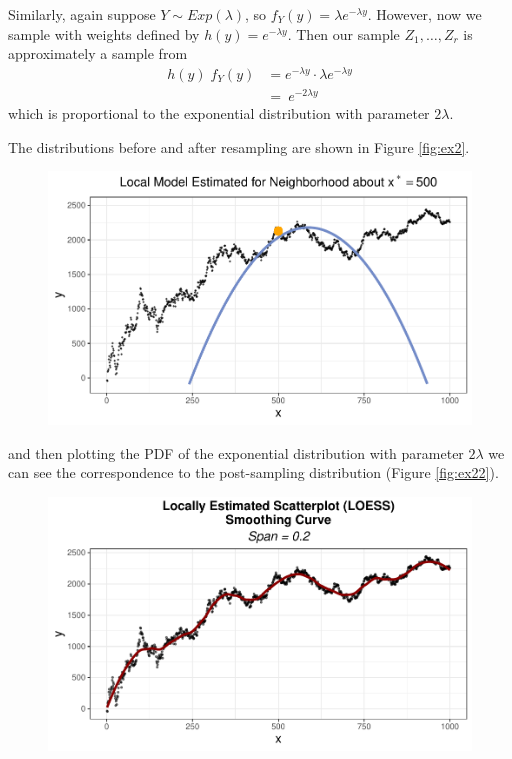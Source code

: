 \documentclass[12pt,twoside]{smiththesis}
\begin{document}
Similarly, again suppose \(Y \sim Exp(\lambda)\), so \(f_Y(y) = \lambda e^{-\lambda y}\). However, now we sample with weights defined by \(h(y)= e^{-\lambda y}\).
Then our sample \(Z_1,\dots,Z_r\) is approximately a sample from
\begin{align*} 
h(y) \; f_Y(y) &=   e^{-\lambda y} \cdot \lambda e^{-\lambda y}\\
&= \ e^{-2 \lambda y}  
\end{align*}
which is proportional to the exponential distribution with parameter \(2\lambda\).

The distributions before and after resampling are shown in Figure \ref{fig:ex2}.
\begin{figure}

{\centering \includegraphics[width=1\linewidth]{thesis_files/figure-latex/unnamed-chunk-23-1} 

}

\caption{\label{fig:ex2}}\label{fig:unnamed-chunk-23}
\end{figure}
and then plotting the PDF of the exponential distribution with parameter \(2\lambda\) we can see the correspondence to the post-sampling distribution (Figure \ref{fig:ex22}).
\begin{figure}

{\centering \includegraphics[width=1\linewidth]{thesis_files/figure-latex/unnamed-chunk-24-1} 

}

\caption{\label{fig:ex22}}\label{fig:unnamed-chunk-24}
\end{figure}
\newpage
\end{document}
